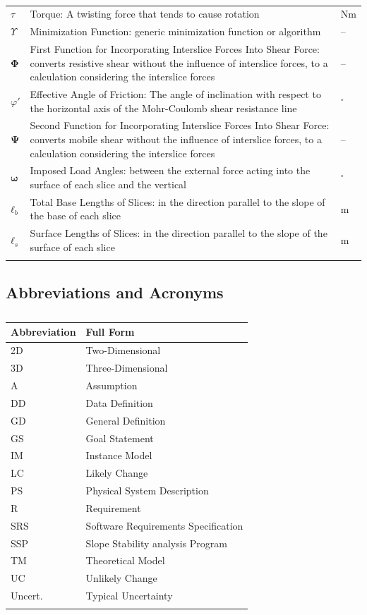 \documentclass[12pt]{article}
\begin{document}
\begin{longtabu}{l X[l] l}
$τ$ & Torque: A twisting force that tends to cause rotation & Nm
\\
$Υ$ & Minimization Function: generic minimization function or algorithm & --
\\
$\mathbf{Φ}$ & First Function for Incorporating Interslice Forces Into Shear Force: converts resistive shear without the influence of interslice forces, to a calculation considering the interslice forces & --
\\
$φ'$ & Effective Angle of Friction: The angle of inclination with respect to the horizontal axis of the Mohr-Coulomb shear resistance line & ${}^{\circ}$
\\
$\mathbf{Ψ}$ & Second Function for Incorporating Interslice Forces Into Shear Force: converts mobile shear without the influence of interslice forces, to a calculation considering the interslice forces & --
\\
$\mathbf{ω}$ & Imposed Load Angles: between the external force acting into the surface of each slice and the vertical & ${}^{\circ}$
\\
${\mathbf{ℓ}_{b}}$ & Total Base Lengths of Slices: in the direction parallel to the slope of the base of each slice & m
\\
${\mathbf{ℓ}_{s}}$ & Surface Lengths of Slices: in the direction parallel to the slope of the surface of each slice & m
\\
\bottomrule
\caption{}
\label{Table:ToS}
\end{longtabu}
\subsection{Abbreviations and Acronyms}
\label{Sec:TAbbAcc}
\begin{longtable}{l l}
\toprule
\textbf{Abbreviation} & \textbf{Full Form}
\\
\midrule
\endhead
2D & Two-Dimensional
\\
3D & Three-Dimensional
\\
A & Assumption
\\
DD & Data Definition
\\
GD & General Definition
\\
GS & Goal Statement
\\
IM & Instance Model
\\
LC & Likely Change
\\
PS & Physical System Description
\\
R & Requirement
\\
SRS & Software Requirements Specification
\\
SSP & Slope Stability analysis Program
\\
TM & Theoretical Model
\\
UC & Unlikely Change
\\
Uncert. & Typical Uncertainty
\\
\bottomrule
\caption{}
\label{Table:TAbbAcc}
\end{longtable}
\end{document}
